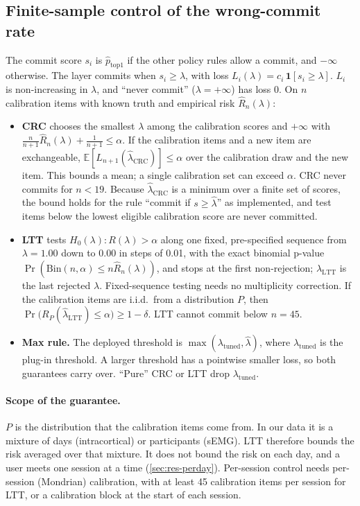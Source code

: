 \subsection{Finite-sample control of the wrong-commit rate}
\label{sec:crc}
The commit score $s_i$ is $\hat p_{\mathrm{top1}}$ if the other policy rules allow a commit, and $-\infty$ otherwise. The layer commits when $s_i \ge \lambda$, with loss $L_i(\lambda) = c_i\,\mathbf{1}[s_i \ge \lambda]$. $L_i$ is non-increasing in $\lambda$, and ``never commit'' ($\lambda = +\infty$) has loss 0. On $n$ calibration items with known truth and empirical risk $\hat R_n(\lambda)$:
\begin{itemize}[leftmargin=*,itemsep=1pt]
  \item \textbf{CRC} \citep{angelopoulos2024crc} chooses the smallest $\lambda$ among the calibration scores and $+\infty$ with $\tfrac{n}{n+1}\hat R_n(\lambda) + \tfrac{1}{n+1} \le \alpha$. If the calibration items and a new item are exchangeable, $\mathbb{E}[L_{n+1}(\hat\lambda_{\mathrm{CRC}})] \le \alpha$ over the calibration draw and the new item. This bounds a mean; a single calibration set can exceed $\alpha$. CRC never commits for $n < 19$. Because $\hat\lambda_{\mathrm{CRC}}$ is a minimum over a finite set of scores, the bound holds for the rule ``commit if $s \ge \hat\lambda$'' as implemented, and test items below the lowest eligible calibration score are never committed.
  \item \textbf{LTT} \citep{angelopoulos2025ltt} tests $H_0(\lambda)\colon R(\lambda) > \alpha$ along one fixed, pre-specified sequence from $\lambda = 1.00$ down to $0.00$ in steps of 0.01, with the exact binomial p-value $\Pr(\mathrm{Bin}(n,\alpha) \le n\hat R_n(\lambda))$, and stops at the first non-rejection; $\hat\lambda_{\mathrm{LTT}}$ is the last rejected $\lambda$. Fixed-sequence testing needs no multiplicity correction. If the calibration items are i.i.d.\ from a distribution $P$, then $\Pr\bigl(R_P(\hat\lambda_{\mathrm{LTT}}) \le \alpha\bigr) \ge 1 - \delta$. LTT cannot commit below $n = 45$.
  \item \textbf{Max rule.} The deployed threshold is $\max(\lambda_{\mathrm{tuned}}, \hat\lambda)$, where $\lambda_{\mathrm{tuned}}$ is the plug-in threshold. A larger threshold has a pointwise smaller loss, so both guarantees carry over. ``Pure'' CRC or LTT drop $\lambda_{\mathrm{tuned}}$.
\end{itemize}

\paragraph{Scope of the guarantee.} $P$ is the distribution that the calibration items come from. In our data it is a mixture of days (intracortical) or participants (sEMG). LTT therefore bounds the risk averaged over that mixture. It does not bound the risk on each day, and a user meets one session at a time (\cref{sec:res-perday}). Per-session control needs per-session (Mondrian) calibration, with at least 45 calibration items per session for LTT, or a calibration block at the start of each session.

